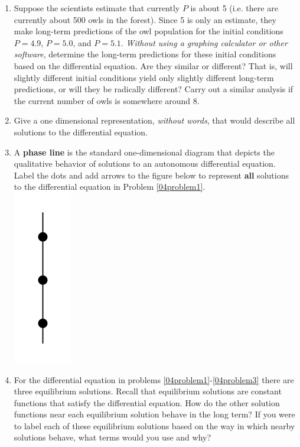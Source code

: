 \begin{enumerate}
\item Suppose the scientists estimate that currently $P$ is about 5 (i.e. there are currently about 500 owls in the forest).  Since 5 is only an estimate, they make long-term predictions of the owl population for the initial conditions $P = 4.9$, $P = 5.0$, and $P = 5.1$. \textit{Without using a graphing calculator or other software}, determine the long-term predictions for these initial conditions based on the differential equation. Are they similar or different?  That is, will slightly different initial conditions yield only slightly different long-term predictions, or will they be radically different? Carry out a similar analysis if the current number of owls is somewhere around 8.\label{04problem1}
\vspace{4in}

\item Give a one dimensional representation, \textit{without words}, that would describe all solutions to the differential equation. \label{04problem2}

\clearpage
\item A \textbf{phase line} is the standard one-dimensional diagram that depicts the qualitative behavior of solutions to an autonomous differential equation. Label the dots and add arrows to the figure below to represent \textbf{all} solutions to the differential equation in Problem \ref{04problem1}. \label{04problem3} \\
\includegraphics[width=1in]{04/04PhaseLine.png}

\item For the differential equation in problems \ref{04problem1}-\ref{04problem3} there are three equilibrium solutions. Recall that equilibrium solutions are constant functions that satisfy the differential equation. How do the other solution functions near each equilibrium solution behave in the long term? If you were to label each of these equilibrium solutions based on the way in which nearby solutions behave, what terms would you use and why? \label{04problem4} 

\end{enumerate}

